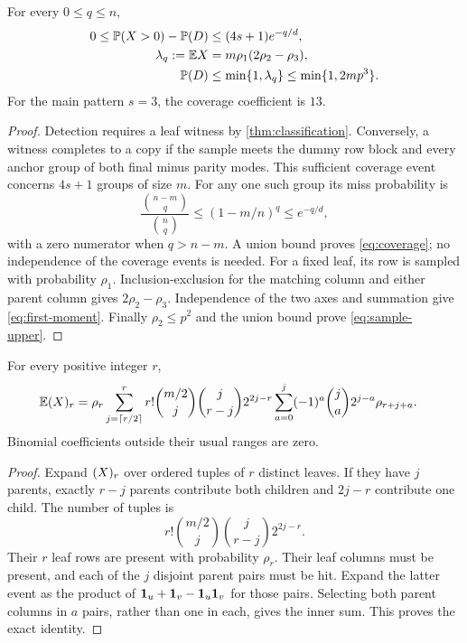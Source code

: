 \begin{proposition}
\label{prop:coverage}
For every \(0\le q\le n\),
\begin{align}
 0\le\mathbb P(X>0)-\mathbb P(D)&\le(4s+1)e^{-q/d},
 \label{eq:coverage}\\
 \lambda_q:=\mathbb E X&=m\rho_1(2\rho_2-\rho_3),
 \label{eq:first-moment}\\
 \mathbb P(D)&\le\min\{1,\lambda_q\}\le\min\{1,2mp^3\}.
 \label{eq:sample-upper}
\end{align}
For the main pattern \(s=3\), the coverage coefficient is \(13\).
\end{proposition}
\begin{proof}
Detection requires a leaf witness by \cref{thm:classification}.
Conversely, a witness completes to a copy if the sample meets the dummy
row block and every anchor group of both final minus parity modes.
This sufficient coverage event concerns \(4s+1\) groups of size \(m\).
For any one such group its miss probability is
\[
 \frac{\binom{n-m}{q}}{\binom nq}
 \le(1-m/n)^q\le e^{-q/d},
\]
with a zero numerator when \(q>n-m\). A union bound proves
\eqref{eq:coverage}; no independence of the coverage events is needed.
For a fixed leaf, its row is sampled with probability \(\rho_1\).
Inclusion-exclusion for the matching column and either parent column
gives \(2\rho_2-\rho_3\). Independence of the two axes and summation
give \eqref{eq:first-moment}. Finally \(\rho_2\le p^2\) and the
union bound prove \eqref{eq:sample-upper}.
\end{proof}

\begin{proposition}
\label{prop:factorial}
For every positive integer \(r\),
\begin{align}
 \mathbb E(X)_{r}={}&\rho_r
 \sum_{j=\lceil r/2\rceil}^{r}
 r!\binom{m/2}{j}\binom j{r-j}2^{2j-r}
 \sum_{a=0}^{j}(-1)^a\binom ja2^{j-a}\rho_{r+j+a}.
 \label{eq:factorial-moments}
\end{align}
Binomial coefficients outside their usual ranges are zero.
\end{proposition}
\begin{proof}
Expand \((X)_{r}\) over ordered tuples of \(r\) distinct leaves.
If they have \(j\) parents, exactly \(r-j\) parents contribute both
children and \(2j-r\) contribute one child. The number of tuples is
\[
 r!\binom{m/2}{j}\binom j{r-j}2^{2j-r}.
\]
Their \(r\) leaf rows are present with probability \(\rho_r\).
Their leaf columns must be present, and each of the \(j\) disjoint
parent pairs must be hit. Expand the latter event as the product of
\(\mathbf 1_u+\mathbf 1_v-\mathbf 1_u\mathbf 1_v\) for those pairs. Selecting both
parent columns in \(a\) pairs, rather than one in each, gives the
inner sum. This proves the exact identity.
\end{proof}

